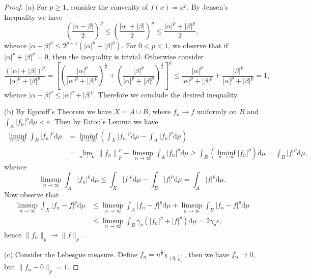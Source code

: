 \begin{proof}
(a) For $p\ge 1$, consider the convexity of $f(x)=x^p$. By Jensen's Inequality we have 
$$
\left( \frac{\left| \alpha -\beta \right|}{2} \right) ^p\le \left( \frac{\left| \alpha \right|+\left| \beta \right|}{2} \right) ^p\le \frac{\left| \alpha \right|^p+\left| \beta \right|^p}{2},
$$
whence $\left| \alpha -\beta \right|^p\le 2^{p-1}\left( \left| \alpha \right|^p+\left| \beta \right|^p \right) $. For $0<p<1$, we observe that if $|\alpha|^p+|\beta|^p=0$, then the inequality is trivial. Otherwise consider 
$$
\frac{\left( \left| \alpha \right|+\left| \beta \right| \right) ^p}{\left| \alpha \right|^p+\left| \beta \right|^p}=\left[ \left( \frac{\left| \alpha \right|^p}{\left| \alpha \right|^p+\left| \beta \right|^p} \right) ^{\frac{1}{p}}+\left( \frac{\left| \beta \right|^p}{\left| \alpha \right|^p+\left| \beta \right|^p} \right) ^{\frac{1}{p}} \right] ^p\le \frac{\left| \alpha \right|^p}{\left| \alpha \right|^p+\left| \beta \right|^p}+\frac{\left| \beta \right|^p}{\left| \alpha \right|^p+\left| \beta \right|^p}=1,
$$
whence $\left| \alpha -\beta \right|^p\le \left| \alpha \right|^p+\left| \beta \right|^p$. Therefore we conclude the desired inequality.\par
(b) By Egoroff's Theorem we have $X=A\cup B$, where $f_n\to f$ uniformly on $B$ and $\int_A|f_n|^p\mathrm{d}\mu<\varepsilon$. Then by Fatou's Lemma we have 
$$
\begin{aligned}
\mathop {\lim\mathrm{inf}} \limits_{n\rightarrow \infty}\int_B{\left| f_n \right|^p\mathrm{d}\mu}&=\mathop {\lim\mathrm{inf}} \limits_{n\rightarrow \infty}\left( \int_X{\left| f_n \right|^p\mathrm{d}\mu}-\int_A{\left| f_n \right|^p\mathrm{d}\mu} \right) 
\\
&=\lim_{n\rightarrow \infty} \left\| f_n \right\| _{p}^{p}-\mathop {\lim\mathrm{sup}} \limits_{n\rightarrow \infty}\int_A{\left| f_n \right|^p\mathrm{d}\mu}\ge \int_B{\left( \mathop {\lim\mathrm{inf}} \limits_{n\rightarrow \infty}\left| f_n \right|^p \right) \mathrm{d}\mu}=\int_B{\left| f \right|^p\mathrm{d}\mu},
\end{aligned}
$$
whence 
$$
\mathop {\lim\mathrm{sup}} \limits_{n\rightarrow \infty}\int_A{\left| f_n \right|^p\mathrm{d}\mu}\le \int_X{\left| f \right|^p\mathrm{d}\mu}-\int_B{\left| f \right|^p\mathrm{d}\mu}=\int_A{\left| f \right|^p\mathrm{d}\mu}.
$$
Now observe that 
$$
\begin{aligned}
\mathop {\lim\mathrm{sup}} \limits_{n\rightarrow \infty}\int_X{\left| f_n-f \right|^p\mathrm{d}\mu}&\le \mathop {\lim\mathrm{sup}} \limits_{n\rightarrow \infty}\int_A{\left| f_n-f \right|^p\mathrm{d}\mu}+\mathop {\lim\mathrm{sup}} \limits_{n\rightarrow \infty}\int_B{\left| f_n-f \right|^p\mathrm{d}\mu}
\\
&\le \mathop {\lim\mathrm{sup}} \limits_{n\rightarrow \infty}\int_B{\gamma _p\left( \left| f_n \right|^p+\left| f \right|^p \right) \mathrm{d}\mu}=2\gamma _p\varepsilon ,
\end{aligned}
$$
hence $\|f_n\|_p\to\|f\|_p$.\par
(c) Consider the Lebesgue measure. Define $f_n=n^{\frac{1}{p}}\chi _{\left( 0,\frac{1}{n} \right]}$, then we have $f_n\to 0$, but $\|f_n-0\|_p=1$.
\end{proof}

